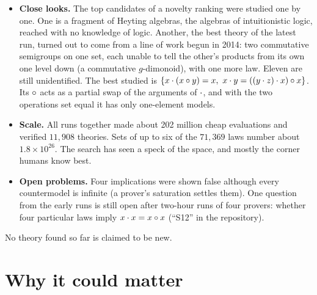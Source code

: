 \documentclass[11pt,a4paper]{article}
\begin{document}
\begin{itemize}
  every one. The next run (X11) moved that filter into the search itself: none of its verified theories was a
  disguise, and two of its candidates now lead the novelty ranking, not yet studied. The latest (X12) ran two versions
  side by side, one pushed toward rare kinds of theory. It found twice as many kinds at the same sample size, with
  scores just as good, but no better candidates.
\item \textbf{Close looks.} The top candidates of a novelty ranking were studied one by one. One is a fragment of
  Heyting algebras, the algebras of intuitionistic logic, reached with no knowledge of logic. Another, the best
  theory of the latest run, turned out to come from a line of work begun in 2014: two commutative semigroups on one
  set, each unable to tell the other's products from its own one level down (a commutative $g$-dimonoid), with one
  more law. Eleven are still unidentified. The best studied is $\{x\cdot(x\circ y)=x,\ x\cdot y=((y\cdot z)\cdot x)\circ x\}$. Its $\circ$ acts as a partial swap of the arguments of
  $\cdot$, and with the two operations set equal it has only one-element models.
\item \textbf{Scale.} All runs together made about 202 million cheap evaluations and verified $11{,}908$ theories.
  Sets of up to six of the $71{,}369$ laws number about $1.8\times10^{26}$. The search has seen a speck of the space,
  and mostly the corner humans know best.
\item \textbf{Open problems.} Four implications were shown false although every countermodel is infinite (a
  prover's saturation settles them). One question from the early runs is still open after two-hour runs of four
  provers: whether four particular laws imply $x\cdot x=x\circ x$ (``S12'' in the repository).
\end{itemize}
No theory found so far is claimed to be new.

\section{Why it could matter}
\end{document}
